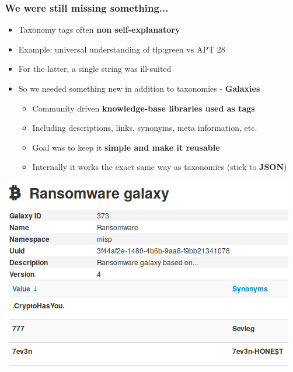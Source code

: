 \begin{frame}
\frametitle{We were still missing something...}
    \begin{itemize}
       \item Taxonomy tags often {\bf non self-explanatory}
       \item Example: universal understanding of tlp:green vs APT 28
       \item For the latter, a single string was ill-suited
       \item So we needed something new in addition to taxonomies - \textbf{Galaxies}
        \begin{itemize}
            \item Community driven \textbf{knowledge-base libraries used as tags}
            \item Including descriptions, links, synonyms, meta information, etc. 
            \item Goal was to keep it \textbf{simple and make it reusable}
            \item Internally it works the exact same way as taxonomies (stick to \textbf{JSON})
        \end{itemize}
    \end{itemize}
    \begin{center}
        \hspace{10em}
        \includegraphics[scale=0.30]{galaxy-ransomware.png}
    \end{center}
\end{frame}


